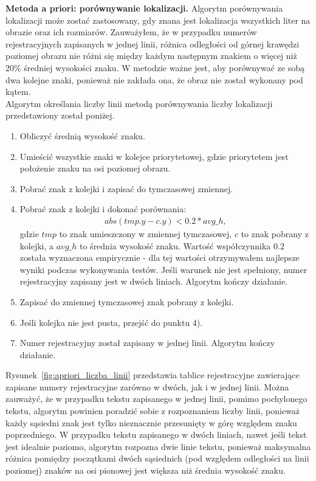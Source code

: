 \textbf{Metoda a priori: porównywanie lokalizacji.} Algorytm porównywania lokalizacji może zostać zastosowany, gdy znana jest lokalizacja wszystkich liter na obrazie oraz ich rozmiarów. Zauważyłem, że w przypadku numerów rejestracyjnych zapisanych w jednej linii, różnica odległości od górnej krawędzi poziomej obrazu nie różni się między każdym następnym znakiem o więcej niż 20\% średniej wysokości znaku. W metodzie ważne jest, aby porównywać ze sobą dwa kolejne znaki, ponieważ nie zakłada ona, że obraz nie został wykonany pod kątem.\\
Algorytm określania liczby linii metodą porównywania liczby lokalizacji przedstawiony został poniżej.
\begin{enumerate}
  \item Obliczyć średnią wysokość znaku.
  \item Umieścić wszystkie znaki w kolejce priorytetowej, gdzie priorytetem jest położenie znaku na osi poziomej obrazu.
  \item Pobrać znak z kolejki i zapisać do tymczasowej zmiennej.
  \item Pobrać znak z kolejki i dokonać porównania:
    \begin{gather*}
      abs(tmp.y - c.y) < 0.2*avg\_h,
    \end{gather*}
    gdzie $tmp$ to znak umieszczony w zmiennej tymczasowej, $c$ to znak pobrany z kolejki, a $avg\_h$ to średnia wysokość znaku. Wartość współczynnika $0.2$ została wyznaczona empirycznie - dla tej wartości otrzymywałem najlepsze wyniki podczas wykonywania testów. Jeśli warunek nie jest spełniony, numer rejestracyjny zapisany jest w dwóch liniach. Algorytm kończy działanie.
  \item Zapisać do zmiennej tymczasowej znak pobrany z kolejki.
  \item Jeśli kolejka nie jest pusta, przejść do punktu 4).
  \item Numer rejestracyjny został zapisany w jednej linii. Algorytm kończy działanie.
\end{enumerate}
Rysunek~\ref{fig:apriori_liczba_linii} przedstawia tablice rejestracyjne zawierające zapisane numery rejestracyjne zarówno w dwóch, jak i w jednej linii. Można zauważyć, że w przypadku tekstu zapisanego w jednej linii, pomimo pochylonego tekstu, algorytm powinien poradzić sobie z rozpoznaniem liczby linii, ponieważ każdy sąsiedni znak jest tylko nieznacznie przesunięty w górę względem znaku poprzedniego. W przypadku tekstu zapisanego w dwóch liniach, nawet jeśli tekst jest idealnie poziomo, algorytm rozpozna dwie linie tekstu, ponieważ maksymalna różnica pomiędzy początkami dwóch sąsiednich (pod względem odległości na linii poziomej) znaków na osi pionowej jest większa niż średnia wysokość znaku.

